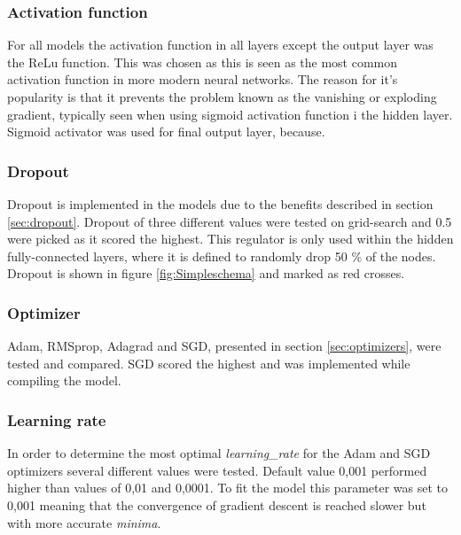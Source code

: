 \subsubsection{Activation function}
For all models the activation function in all layers except the output layer was the ReLu function. This was chosen as this is seen as the most common activation function in more modern neural networks. The reason for it's popularity is that it prevents the problem known as the vanishing or exploding gradient, typically seen when using sigmoid activation function i the hidden layer. \citep{Goodfellow2016}    
Sigmoid activator was used for final output layer, because.

\subsubsection{Dropout}
Dropout is implemented in the models due to the benefits described in section \ref{sec:dropout}. Dropout of three different values were tested on grid-search and 0.5 were picked as it scored the highest. This regulator is only used within the hidden fully-connected layers, where it is defined to randomly drop 50 \% of the nodes. Dropout is shown in figure \ref{fig:Simpleschema} and marked as red crosses. 

\subsubsection{Optimizer}
Adam, RMSprop, Adagrad and SGD, presented in section \ref{sec:optimizers}, were tested and compared. SGD scored the highest and was implemented while compiling the model.

\subsubsection{Learning rate}
In order to determine the most optimal \textit{learning\_rate} for the Adam  and SGD optimizers several different values were tested. Default value 0,001 performed higher than values of 0,01 and 0,0001. To fit the model this parameter was set to 0,001 meaning that the convergence of gradient descent is reached slower but with more accurate \textit{minima}. 

